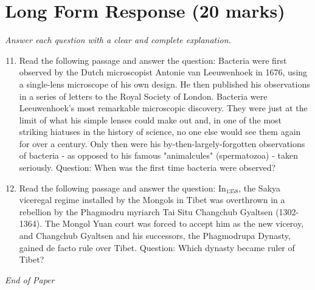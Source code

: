 \documentclass[12pt]{article}
\begin{document}
\section*{Long Form Response (20 marks)}
\textit{Answer each question with a clear and complete explanation.}
\begin{enumerate}[label=\arabic*.]
\setcounter{enumi}{10}
\item Read the following passage and answer the question: Bacteria were first observed by the Dutch microscopist Antonie van Leeuwenhoek in 1676, using a single-lens microscope of his own design. He then published his observations in a series of letters to the Royal Society of London. Bacteria were Leeuwenhoek's most remarkable microscopic discovery. They were just at the limit of what his simple lenses could make out and, in one of the most striking hiatuses in the history of science, no one else would see them again for over a century. Only then were his by-then-largely-forgotten observations of bacteria - as opposed to his famous "animalcules" (spermatozoa) - taken seriously. Question: When was the first time bacteria were observed?
\item Read the following passage and answer the question: In$_{1358}$, the Sakya viceregal regime installed by the Mongols in Tibet was overthrown in a rebellion by the Phagmodru myriarch Tai Situ Changchub Gyaltsen (1302-1364). The Mongol Yuan court was forced to accept him as the new viceroy, and Changchub Gyaltsen and his successors, the Phagmodrupa Dynasty, gained de facto rule over Tibet. Question: Which dynasty became ruler of Tibet?
\end{enumerate}

\vfill
\noindent\textit{End of Paper}
\end{document}
